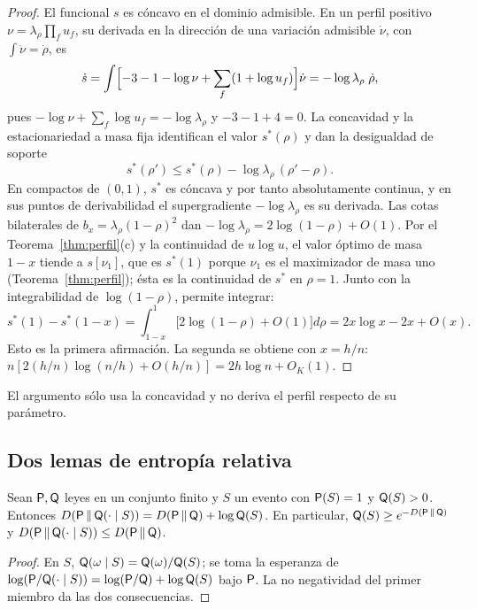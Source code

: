 \begin{proof}
El funcional $s$ es cóncavo en el dominio admisible. En un perfil positivo
$\nu=\lambda_\rho\prod_fu_f$, su derivada en la dirección de una variación admisible $\dot\nu$,
con $\int\dot\nu=\dot\rho$, es
\[
 \dot s=\int\Bigl[-3-1-\log\nu+\sum_f(1+\log u_f)\Bigr]\dot\nu=-\log\lambda_\rho\;\dot\rho ,
\]
pues $-\log\nu+\sum_f\log u_f=-\log\lambda_\rho$ y $-3-1+4=0$. La concavidad y la
estacionariedad a masa fija identifican el valor $s^*(\rho)$ y dan la desigualdad de soporte
\[
 s^*(\rho')\le s^*(\rho)-\log\lambda_\rho\,(\rho'-\rho).
\]
En compactos de $(0,1)$, $s^*$ es cóncava y por tanto absolutamente continua, y en sus puntos de
derivabilidad el supergradiente $-\log\lambda_\rho$ es su derivada. Las cotas bilaterales de
$b_x=\lambda_\rho(1-\rho)^2$ dan $-\log\lambda_\rho=2\log(1-\rho)+O(1)$. Por el
Teorema~\ref{thm:perfil}(c) y la continuidad de $u\log u$, el valor óptimo de masa $1-x$ tiende a
$s[\nu_1]$, que es $s^*(1)$ porque $\nu_1$ es el maximizador de masa uno
(Teorema~\ref{thm:perfil}); ésta es la continuidad de $s^*$ en $\rho=1$. Junto con la
integrabilidad de $\log(1-\rho)$, permite integrar:
\[
 s^*(1)-s^*(1-x)=\int_{1-x}^1\bigl[2\log(1-\rho)+O(1)\bigr]d\rho=2x\log x-2x+O(x).
\]
Esto es la primera afirmación. La segunda se obtiene con $x=h/n$:
$n[2(h/n)\log(n/h)+O(h/n)]=2h\log n+O_K(1)$.
\end{proof}

El argumento sólo usa la concavidad y no deriva el perfil respecto de su parámetro.

\subsection{Dos lemas de entropía relativa}

\begin{lema}\label{lem:exito}
Sean $\mathsf{P},\mathsf{Q}$ leyes en un conjunto finito y $S$ un evento con $\mathsf{P}(S)=1$ y $\mathsf{Q}(S)>0$.
Entonces $D(\mathsf{P}\,\Vert\,\mathsf{Q}(\cdot\mid S))=D(\mathsf{P}\,\Vert\,\mathsf{Q})+\log\mathsf{Q}(S)$. En particular,
$\mathsf{Q}(S)\ge e^{-D(\mathsf{P}\,\Vert\,\mathsf{Q})}$ y $D(\mathsf{P}\,\Vert\,\mathsf{Q}(\cdot\mid S))\le D(\mathsf{P}\,\Vert\,\mathsf{Q})$.
\end{lema}

\begin{proof}
En $S$, $\mathsf{Q}(\omega\mid S)=\mathsf{Q}(\omega)/\mathsf{Q}(S)$; se toma la esperanza de
$\log(\mathsf{P}/\mathsf{Q}(\cdot\mid S))=\log(\mathsf{P}/\mathsf{Q})+\log\mathsf{Q}(S)$ bajo $\mathsf{P}$. La no negatividad del primer
miembro da las dos consecuencias.
\end{proof}

